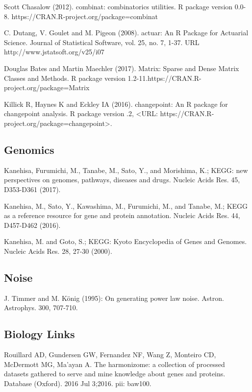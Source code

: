 \begin{thebibliography}{00}
	 Scott Chasalow (2012). 
	\newblock combinat: combinatorics utilities. 
	\newblock R package version 0.0-8. https://CRAN.R-project.org/package=combinat
	
	 C. Dutang, V. Goulet and M. Pigeon (2008). 
	\newblock actuar: An R Package for Actuarial Science. 
	\newblock Journal of Statistical Software, vol. 25, no. 7, 1-37. URL http://www.jstatsoft.org/v25/i07
	
	 Douglas Bates and Martin Maechler (2017). 
	\newblock Matrix: Sparse and Dense Matrix Classes and Methods. 
	\newblock R package version 1.2-11.https://CRAN.R-project.org/package=Matrix
	
	 Killick R, Haynes K and Eckley IA (2016).
	\newblock changepoint: An R package for changepoint analysis. R package version
	.2, <URL: https://CRAN.R-project.org/package=changepoint>.
	
\subsection{Genomics}
	
	 Kanehisa, Furumichi, M., Tanabe, M., Sato, Y., and Morishima, K.; 
	\newblock KEGG: new perspectives on genomes, pathways, diseases and drugs. 
	\newblock Nucleic Acids Res. 45, D353-D361 (2017).
	
	 Kanehisa, M., Sato, Y., Kawashima, M., Furumichi, M., and Tanabe, M.; 
	\newblock KEGG as a reference resource for gene and protein annotation. 
	\newblock Nucleic Acids Res. 44, D457-D462 (2016).
	
	 Kanehisa, M. and Goto, S.; 
	\newblock KEGG: Kyoto Encyclopedia of Genes and Genomes. 
	\newblock Nucleic Acids Res. 28, 27-30 (2000). 
	

\subsection{Noise}

	 J. Timmer and M. König (1995): 
	\newblock On generating power law noise. 
	\newblock Astron. Astrophys. 300, 707-710.
	
	
\subsection{Biology Links}

 Rouillard AD, Gundersen GW, Fernandez NF, Wang Z, Monteiro CD, McDermott MG, Ma'ayan A. 
\newblock The harmonizome: a collection of processed datasets gathered to serve and mine knowledge about genes and proteins. 
\newblock Database (Oxford). 2016 Jul 3;2016. pii: baw100. 

	
\end{thebibliography}

